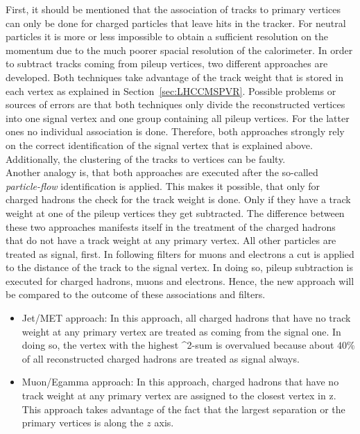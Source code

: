 First, it should be mentioned that the association of tracks to primary vertices can only be done for charged particles that leave hits in the tracker. For neutral particles it is more or less impossible to obtain a sufficient resolution on the momentum due to the much poorer spacial resolution of the calorimeter. In order to subtract tracks coming from pileup vertices, two different approaches are developed. Both techniques take advantage of the track weight that is stored in each vertex as explained in Section~\ref{sec:LHCCMSPVR}. Possible problems or sources of errors are that both techniques only divide the reconstructed vertices into one signal vertex and one group containing all pileup vertices. For the latter ones no individual association is done. Therefore, both approaches strongly rely on the correct identification of the signal vertex that is explained above. Additionally, the clustering of the tracks to vertices can be faulty. \\
Another analogy is, that both approaches are executed after the so-called \textit{particle-flow} identification is applied. This makes it possible, that only for charged hadrons  the check for the track weight is done.  Only if they have a track weight at one of the pileup vertices they get subtracted. The difference between these two approaches manifests itself in the treatment of the charged hadrons that do not have a track weight at any primary vertex. All other particles are treated as signal, first. In following filters for muons and electrons a cut is applied to the distance of the track to the signal vertex. In doing so, pileup subtraction is executed for charged hadrons, muons and electrons. Hence, the new approach will be compared to the outcome of these associations and filters.

\begin{itemize}
    \item{Jet/MET approach:} In this approach, all charged hadrons that have no track weight at any primary vertex are treated as coming from the signal one. In doing so, the vertex with the highest \pt{}^{2}-sum is overvalued because about $40\%$ of all reconstructed charged hadrons are treated as signal always.

\item{Muon/Egamma approach:} In this approach, charged hadrons that have no track weight at any primary vertex are assigned to the closest vertex in z. This approach takes advantage of the fact that the largest separation or the primary vertices is along the $z$ axis.
\end{itemize}

